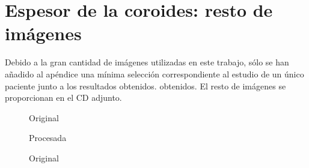 \section{Espesor de la coroides: resto de imágenes}
Debido a la gran cantidad de imágenes utilizadas en este trabajo, sólo
se han añadido al apéndice una mínima selección correspondiente al
estudio de un único paciente junto a los resultados obtenidos.
obtenidos. El resto de imágenes se proporcionan en el CD adjunto.
\begin{figure}[H]
  \caption{Original}
  \centering \setlength\fboxsep{0pt} \setlength\fboxrule{0.5pt}
\end{figure}

\begin{figure}[H]
  \caption{Procesada}
  \centering \setlength\fboxsep{0pt} \setlength\fboxrule{0.5pt}
\end{figure}



\begin{figure}[H]
  \caption{Original}
  \centering \setlength\fboxsep{0pt} \setlength\fboxrule{0.5pt}
\end{figure}

